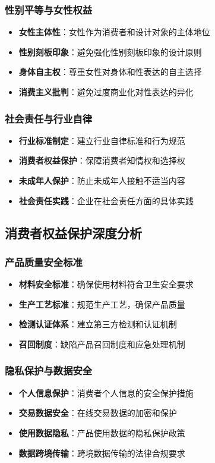 \documentclass[12pt,UTF8]{ctexbook}
\begin{document}
\subsubsection{性别平等与女性权益}
\begin{itemize}[leftmargin=2cm]
	\item \textbf{女性主体性}：女性作为消费者和设计对象的主体地位
	\item \textbf{性别刻板印象}：避免强化性别刻板印象的设计原则
	\item \textbf{身体自主权}：尊重女性对身体和性表达的自主选择
	\item \textbf{消费主义批判}：避免过度商业化对性表达的异化
\end{itemize}

\subsubsection{社会责任与行业自律}
\begin{itemize}[leftmargin=2cm]
	\item \textbf{行业标准制定}：建立行业自律标准和行为规范
	\item \textbf{消费者权益保护}：保障消费者知情权和选择权
	\item \textbf{未成年人保护}：防止未成年人接触不适当内容
	\item \textbf{社会责任实践}：企业在社会责任方面的具体实践
\end{itemize}

\subsection{消费者权益保护深度分析}
\subsubsection{产品质量安全标准}
\begin{itemize}[leftmargin=2cm]
	\item \textbf{材料安全标准}：确保使用材料符合卫生安全要求
	\item \textbf{生产工艺标准}：规范生产工艺，确保产品质量
	\item \textbf{检测认证体系}：建立第三方检测和认证机制
	\item \textbf{召回制度}：缺陷产品召回制度和应急处理机制
\end{itemize}

\subsubsection{隐私保护与数据安全}
\begin{itemize}[leftmargin=2cm]
	\item \textbf{个人信息保护}：消费者个人信息的安全保护措施
	\item \textbf{交易数据安全}：在线交易数据的加密和保护
	\item \textbf{使用数据隐私}：产品使用数据的隐私保护政策
	\item \textbf{数据跨境传输}：跨境数据传输的法律合规要求
\end{itemize}
\end{document}
